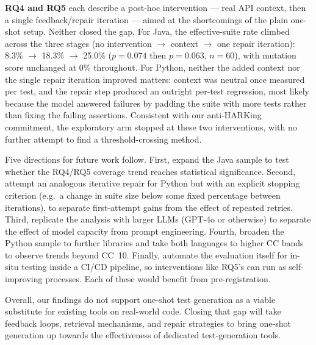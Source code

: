 \textbf{RQ4 and RQ5} each describe a post-hoc intervention --- real API context, then a
single feedback/repair iteration --- aimed at the shortcomings of the plain one-shot setup.
Neither closed the gap. For Java, the effective-suite rate climbed across the three stages
(no intervention $\to$ context $\to$ one repair iteration): 8.3\% $\to$ 18.3\% $\to$ 25.0\%
($p=0.074$ then $p=0.063$, $n=60$), with mutation score unchanged at 0\% throughout. For
Python, neither the added context nor the single repair iteration improved matters: context
was neutral once measured per test, and the repair step produced an outright per-test
regression, most likely because the model answered failures by padding the suite with more
tests rather than fixing the failing assertions. Consistent with our anti-HARKing
commitment, the exploratory arm stopped at these two interventions, with no further attempt
to find a threshold-crossing method.

Five directions for future work follow. First, expand the Java sample to test whether the
RQ4/RQ5 coverage trend reaches statistical significance. Second, attempt an analogous
iterative repair for Python but with an explicit stopping criterion (e.g.\ a change in
suite size below some fixed percentage between iterations), to separate first-attempt gains
from the effect of repeated retries. Third, replicate the analysis with larger LLMs (GPT-4o
or otherwise) to separate the effect of model capacity from prompt engineering. Fourth,
broaden the Python sample to further libraries and take both languages to higher CC bands
to observe trends beyond CC~10. Finally, automate the evaluation itself for in-situ testing
inside a CI/CD pipeline, so interventions like RQ5's can run as self-improving processes.
Each of these would benefit from pre-registration.

Overall, our findings do not support one-shot test generation as a viable substitute for
existing tools on real-world code. Closing that gap will take feedback loops, retrieval
mechanisms, and repair strategies to bring one-shot generation up towards the effectiveness
of dedicated test-generation tools.
